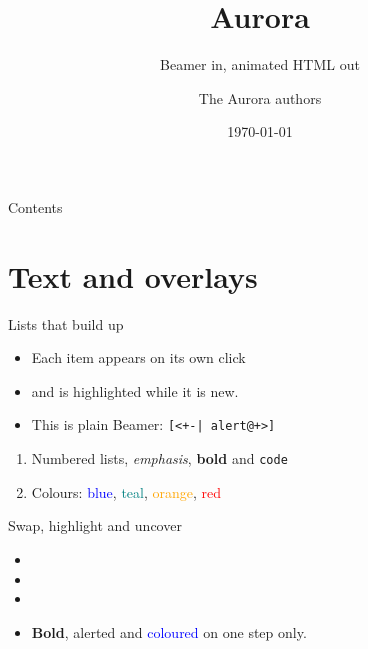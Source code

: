 \documentclass{beamer}
\title{Aurora}
\subtitle{Beamer in, animated HTML out}
\author{The Aurora authors}
\date{\today}
\begin{document}
\begin{frame}
  \titlepage
\end{frame}

\begin{frame}{Contents}
  \tableofcontents
\end{frame}

\section{Text and overlays}

\begin{frame}{Lists that build up}
  \begin{itemize}[<+-| alert@+>]
    \item Each item appears on its own click
    \item and is highlighted while it is new.
    \item This is plain Beamer: \texttt{[<+-| alert@+>]}
  \end{itemize}
  \begin{enumerate}[<+->]
    \item Numbered lists, \emph{emphasis}, \textbf{bold} and \texttt{code}
    \item Colours: \textcolor{blue}{blue}, \textcolor{teal}{teal}, \textcolor{orange}{orange}, \textcolor{red}{red}
  \end{enumerate}
\end{frame}

\begin{frame}{Swap, highlight and uncover}
  \begin{itemize}
    \item {}
    \item {}
    \item {}
    \item \textbf<5>{Bold}, \alert<5>{alerted} and \textcolor<5>{blue}{coloured} on one step only.
  \end{itemize}
\end{frame}
\end{document}
